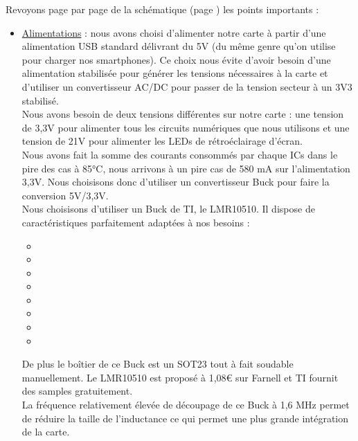         
Revoyons page par page de la schématique (page \pageref{sec:AnnexeSchematic}) les points importants :
\begin{itemize}
	\item \hyperlink{Schematic.2}{Alimentations} :
	      nous avons choisi d'alimenter notre carte à partir d'une alimentation USB standard délivrant du 5V (du même genre qu'on utilise pour charger nos smartphones).
	      Ce choix nous évite d'avoir besoin d'une alimentation stabilisée pour générer les tensions nécessaires à la carte et d'utiliser un convertisseur AC/DC pour passer de la tension secteur à un 3V3 stabilisé. \\
	      Nous avons besoin de deux tensions différentes sur notre carte : une tension de 3,3V pour alimenter tous les circuits numériques que nous utilisons et une tension de 21V pour alimenter les LEDs de rétroéclairage d'écran. \\
	      Nous avons fait la somme des courants consommés par chaque \glspl{IC} dans le pire des cas à 85°C, nous arrivons à un pire cas de 580 mA sur l'alimentation 3,3V.
	      Nous choisisons donc d'utiliser un convertisseur Buck pour faire la conversion 5V/3,3V. \\
	      Nous choisisons d'utiliser un Buck de TI, le LMR10510.
	      Il dispose de caractéristiques parfaitement adaptées à nos besoins :
	      \begin{itemize}
	      	\item {}
	      	\item {}
	      	\item {}
	      	\item {}
	      	\item {}
	      	\item {}
	      	\item {}
	      	\item {}
	      \end{itemize}
	      De plus le boîtier de ce Buck est un SOT23 tout à fait soudable manuellement.
	      Le LMR10510 est proposé à 1,08€ sur Farnell et TI fournit des samples gratuitement. \\
	      La fréquence relativement élevée de découpage de ce Buck à 1,6 MHz permet de réduire la taille de l'inductance ce qui permet une plus grande intégration de la carte.
          

\end{itemize}
